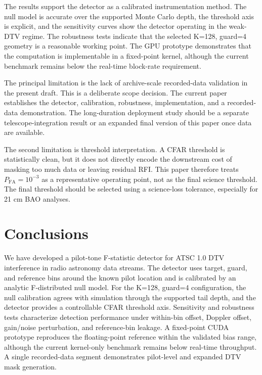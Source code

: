 \documentclass[10pt,letterpaper]{article}
\newcommand{\pfa}{P_{\mathrm{FA}}}
\begin{document}
The results support the detector as a calibrated instrumentation method. The null model is accurate over the supported Monte Carlo depth, the threshold axis is explicit, and the sensitivity curves show the detector operating in the weak-DTV regime. The robustness tests indicate that the selected K=128, guard=4 geometry is a reasonable working point. The GPU prototype demonstrates that the computation is implementable in a fixed-point kernel, although the current benchmark remains below the real-time block-rate requirement.

The principal limitation is the lack of archive-scale recorded-data validation in the present draft. This is a deliberate scope decision. The current paper establishes the detector, calibration, robustness, implementation, and a recorded-data demonstration. The long-duration deployment study should be a separate telescope-integration result or an expanded final version of this paper once data are available.

The second limitation is threshold interpretation. A CFAR threshold is statistically clean, but it does not directly encode the downstream cost of masking too much data or leaving residual RFI. This paper therefore treats $\pfa=10^{-3}$ as a representative operating point, not as the final science threshold. The final threshold should be selected using a science-loss tolerance, especially for 21 cm BAO analyses.

\section{Conclusions}
\label{sec:conclusion}

We have developed a pilot-tone F-statistic detector for ATSC 1.0 DTV interference in radio astronomy data streams. The detector uses target, guard, and reference bins around the known pilot location and is calibrated by an analytic F-distributed null model. For the K=128, guard=4 configuration, the null calibration agrees with simulation through the supported tail depth, and the detector provides a controllable CFAR threshold axis. Sensitivity and robustness tests characterize detection performance under within-bin offset, Doppler offset, gain/noise perturbation, and reference-bin leakage. A fixed-point CUDA prototype reproduces the floating-point reference within the validated bias range, although the current kernel-only benchmark remains below real-time throughput. A single recorded-data segment demonstrates pilot-level and expanded DTV mask generation.
\end{document}
